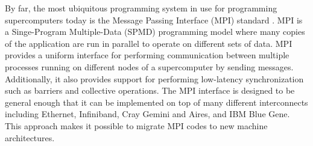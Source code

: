 By far, the most ubiquitous programming system
in use for programming supercomputers today is
the Message Passing Interface (MPI) standard \cite{MPI}.
MPI is a Singe-Program Multiple-Data (SPMD) programming model
where many copies of the application are run in 
parallel to operate on different sets of data.
MPI provides a uniform interface for performing
communication between multiple processes running
on different nodes of a supercomputer by sending
messages. Additionally, it also provides support
for performing low-latency synchronization such
as barriers and collective operations. The MPI
interface is designed to be general enough that it
can be implemented on top of many different 
interconnects including Ethernet, Infiniband,
Cray Gemini and Aires, and IBM Blue Gene. This
approach makes it possible to migrate
MPI codes to new machine architectures.

